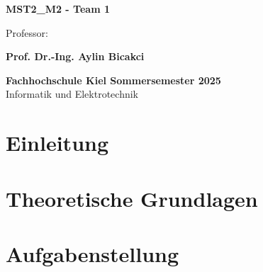 \documentclass[12pt,a4paper,ngerman,captions=tableheading]{scrartcl}
\begin{document}
\begin{titlepage}
    

    \vspace{0.5cm}
    
\large \textbf{MST2\_M2 - Team 1}

\vspace{1cm}
{\large Professor:}

    \vspace{0.2cm}
    
\large \textbf{Prof. Dr.-Ing. Aylin Bicakci }

    \vspace{0.3cm}

\large \textbf{Fachhochschule Kiel \linebreak Sommersemester 2025\\}
{\large Informatik und Elektrotechnik}

\vfill
\end{titlepage}


\newpage


\tableofcontents  
\newpage


\section{Einleitung}




\section{Theoretische Grundlagen}



\section{Aufgabenstellung}

\end{document}
